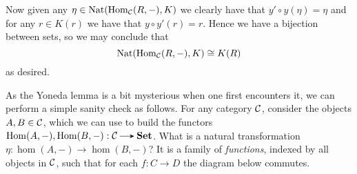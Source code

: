 \begin{prf}
        Now given any $\eta \in \operatorname{\mathrm{Nat}}(\operatorname{\mathrm{Hom}}_{\mathcal{C}}(R, -), K)$
        we clearly have that $y' \circ y(\eta) = \eta$ and for any $r \in K(r)$ 
        we have that $y \circ y'(r) = r$. Hence we have a bijection between sets, so we 
        may conclude that 
        \[
            \operatorname{\mathrm{Nat}}(\operatorname{\mathrm{Hom}}_{\mathcal{C}}(R, -), K) \cong K(R)
        \]  
        as desired.
    \end{prf}
    
    \begin{example}
        As the Yoneda lemma is a bit mysterious when one first 
        encounters it, we can perform a  simple sanity check as follows.
        For any category $\mathcal{C}$, consider the objects
        $A,B \in \mathcal{C}$, which we can use to build the functors $\hom(A, -),
        \hom(B,-): \cc \to \textbf{Set}$.
        What is a natural transformation $\eta: \hom(A, -) \to \hom(B, -)$?
        It is a family of \emph{functions}, indexed by all objects in  $\mathcal{C}$,
        such that for each $f: C \to D$ the diagram below commutes.
        \begin{center}
            \hspace{0.6cm}
            \hspace{0.3cm}
\end{center}
\end{example}
